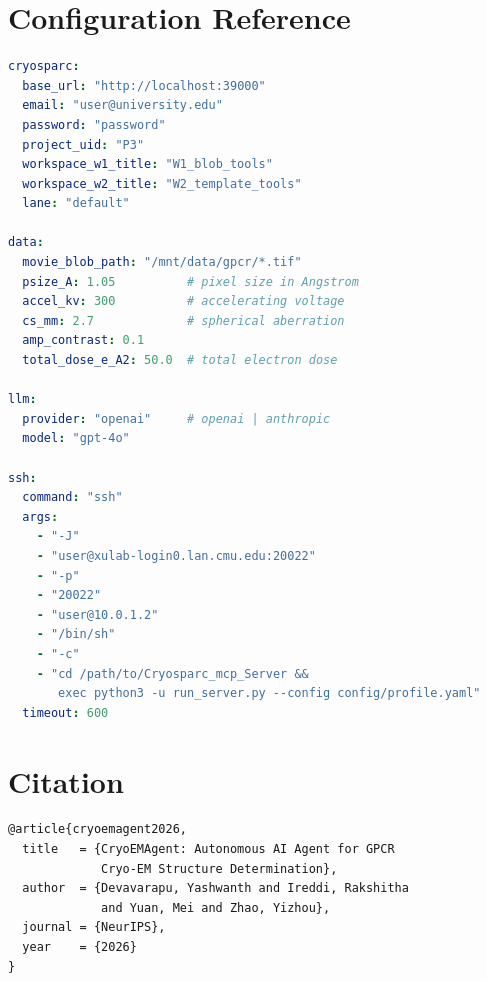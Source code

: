 \documentclass[12pt, a4paper]{article}
\begin{document}
\appendix

\section{Configuration Reference}
\label{app:config}

\begin{lstlisting}[language=yaml, caption={profile.yaml --- full example},
  label=lst:config]
cryosparc:
  base_url: "http://localhost:39000"
  email: "user@university.edu"
  password: "password"
  project_uid: "P3"
  workspace_w1_title: "W1_blob_tools"
  workspace_w2_title: "W2_template_tools"
  lane: "default"

data:
  movie_blob_path: "/mnt/data/gpcr/*.tif"
  psize_A: 1.05          # pixel size in Angstrom
  accel_kv: 300          # accelerating voltage
  cs_mm: 2.7             # spherical aberration
  amp_contrast: 0.1
  total_dose_e_A2: 50.0  # total electron dose

llm:
  provider: "openai"     # openai | anthropic
  model: "gpt-4o"

ssh:
  command: "ssh"
  args:
    - "-J"
    - "user@xulab-login0.lan.cmu.edu:20022"
    - "-p"
    - "20022"
    - "user@10.0.1.2"
    - "/bin/sh"
    - "-c"
    - "cd /path/to/Cryosparc_mcp_Server &&
       exec python3 -u run_server.py --config config/profile.yaml"
  timeout: 600
\end{lstlisting}

\section{Citation}
\label{app:citation}

\begin{lstlisting}[numbers=none, caption={BibTeX citation},
  label=lst:bibtex]
@article{cryoemagent2026,
  title   = {CryoEMAgent: Autonomous AI Agent for GPCR
             Cryo-EM Structure Determination},
  author  = {Devavarapu, Yashwanth and Ireddi, Rakshitha
             and Yuan, Mei and Zhao, Yizhou},
  journal = {NeurIPS},
  year    = {2026}
}
\end{lstlisting}
\end{document}
